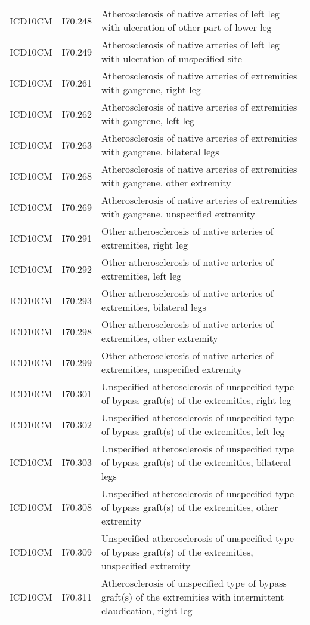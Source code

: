 \begin{longtable}{p{}p{}p{}}
  ICD10CM & I70.248 & Atherosclerosis of native arteries of left leg with ulceration of other part of lower leg \\ 
  ICD10CM & I70.249 & Atherosclerosis of native arteries of left leg with ulceration of unspecified site \\ 
  ICD10CM & I70.261 & Atherosclerosis of native arteries of extremities with gangrene, right leg \\ 
  ICD10CM & I70.262 & Atherosclerosis of native arteries of extremities with gangrene, left leg \\ 
  ICD10CM & I70.263 & Atherosclerosis of native arteries of extremities with gangrene, bilateral legs \\ 
  ICD10CM & I70.268 & Atherosclerosis of native arteries of extremities with gangrene, other extremity \\ 
  ICD10CM & I70.269 & Atherosclerosis of native arteries of extremities with gangrene, unspecified extremity \\ 
  ICD10CM & I70.291 & Other atherosclerosis of native arteries of extremities, right leg \\ 
  ICD10CM & I70.292 & Other atherosclerosis of native arteries of extremities, left leg \\ 
  ICD10CM & I70.293 & Other atherosclerosis of native arteries of extremities, bilateral legs \\ 
  ICD10CM & I70.298 & Other atherosclerosis of native arteries of extremities, other extremity \\ 
  ICD10CM & I70.299 & Other atherosclerosis of native arteries of extremities, unspecified extremity \\ 
  ICD10CM & I70.301 & Unspecified atherosclerosis of unspecified type of bypass graft(s) of the extremities, right leg \\ 
  ICD10CM & I70.302 & Unspecified atherosclerosis of unspecified type of bypass graft(s) of the extremities, left leg \\ 
  ICD10CM & I70.303 & Unspecified atherosclerosis of unspecified type of bypass graft(s) of the extremities, bilateral legs \\ 
  ICD10CM & I70.308 & Unspecified atherosclerosis of unspecified type of bypass graft(s) of the extremities, other extremity \\ 
  ICD10CM & I70.309 & Unspecified atherosclerosis of unspecified type of bypass graft(s) of the extremities, unspecified extremity \\ 
  ICD10CM & I70.311 & Atherosclerosis of unspecified type of bypass graft(s) of the extremities with intermittent claudication, right leg \\ 

\end{longtable}

